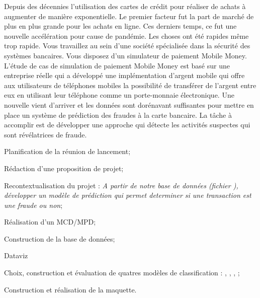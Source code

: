 \begingroup
\renewcommand{\cleardoublepage}{}
\clearpage
{}
\endgroup

Depuis des décennies l'utilisation des cartes de crédit pour réaliser de achats à augmenter de
manière exponentielle. Le premier facteur fut la part de marché de plus en plus grande pour
les achats en ligne. Ces derniers temps, ce fut une nouvelle accélération pour cause de
pandémie. Les choses ont été rapides même trop rapide. \nextpar
Vous travaillez au sein d'une société spécialisée dans la sécurité des systèmes bancaires.
Vous disposez d'un simulateur de paiement Mobile Money.
L'étude de cas de simulation de paiement Mobile Money est basé sur une entreprise réelle
qui a développé une implémentation d'argent mobile qui offre aux utilisateurs de téléphones
mobiles la possibilité de transférer de l'argent entre eux en utilisant leur téléphone comme un
porte-monnaie électronique. \nextpar
Une nouvelle vient d'arriver et les données sont dorénavant suffisantes pour mettre en place
un système de prédiction des fraudes à la carte bancaire.
La tâche à accomplir est de développer une approche qui détecte les activités suspectes qui
sont révélatrices de fraude.

    \begin{arabic-enum}
        \item Planification de la réunion de lancement;
        \item Rédaction d'une proposition de projet;
        \item Recontextualisation du projet : \emph{A partir de notre base de données (fichier ), développer un modèle de prédiction qui permet determiner si une transaction est une fraude ou non};
        \item Réalisation d'un MCD/MPD;
        \item Construction de la base de données;
        \item Dataviz
        \item Choix, construction et évaluation de quatres modèles de classification : , , , ;
        \item Construction et réalisation de la maquette.
    \end{arabic-enum}
